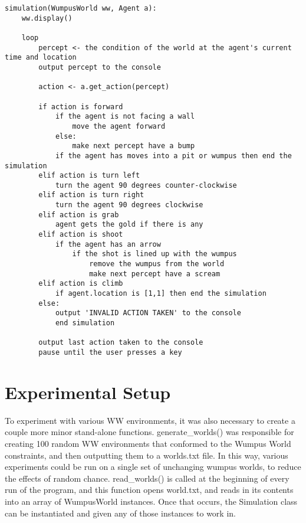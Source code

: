 \documentclass[10 pt.]{article}
\begin{document}
\begin{verbatim}
simulation(WumpusWorld ww, Agent a):
    ww.display()
 
    loop
        percept <- the condition of the world at the agent's current time and location
        output percept to the console

        action <- a.get_action(percept)

        if action is forward
            if the agent is not facing a wall
                move the agent forward
            else:
                make next percept have a bump
            if the agent has moves into a pit or wumpus then end the simulation
        elif action is turn left
            turn the agent 90 degrees counter-clockwise
        elif action is turn right
            turn the agent 90 degrees clockwise
        elif action is grab
            agent gets the gold if there is any
        elif action is shoot
            if the agent has an arrow
                if the shot is lined up with the wumpus
                    remove the wumpus from the world
                    make next percept have a scream
        elif action is climb
            if agent.location is [1,1] then end the simulation
        else:
            output 'INVALID ACTION TAKEN' to the console
            end simulation

        output last action taken to the console
        pause until the user presses a key
\end{verbatim}

\section{Experimental Setup}
To experiment with various WW environments, it was also necessary to create a
couple more minor stand-alone functions. generate\_worlds() was responsible for
creating 100 random WW environments that conformed to the Wumpus World
constraints, and then outputting them to a worlds.txt file. In this way,
various experiments could be run on a single set of unchanging wumpus worlds,
to reduce the effects of random chance. read\_worlds() is called at the
beginning of every run of the program, and this function opens world.txt, and
reads in its contents into an array of WumpusWorld instances. Once that occurs,
the Simulation class can be instantiated and given any of those instances to
work in.
\end{document}
